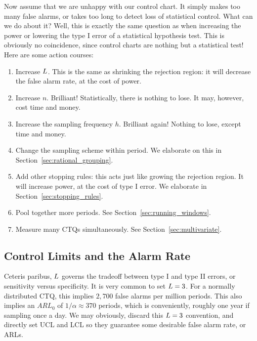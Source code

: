 Now assume that we are unhappy with our control chart. 
It simply makes too many false alarms, or takes too long to detect loss of statistical control.
What can we do about it?
Well, this is exactly the same question as when increasing the power or lowering the type I error of a statistical hypothesis test. This is obviously no coincidence, since control charts are nothing but a statistical test!
Here are some action courses:
\begin{enumerate}
\item Increase $L$. This is the same as shrinking the rejection region: 
it will decrease the false alarm rate, at the cost of power.
\item Increase $n$. Brilliant! Statistically, there is nothing to lose. It may, however, cost time and money.
\item Increase the sampling frequency $h$. Brilliant again! Nothing to lose, except time and money.
\item Change the sampling scheme within period. We elaborate on this in Section~\ref{sec:rational_grouping}.
\item Add other stopping rules: 
this acts just like growing the rejection region. It will increase power, at the cost of type I error. 
We elaborate in Section~\ref{sec:stopping_rules}.
\item Pool together more periods. See Section~\ref{sec:running_windows}.
\item Measure many CTQs simultaneously. See Section~\ref{sec:multivariate}. 
\end{enumerate}






\subsection{Control Limits and the Alarm Rate}
Ceteris paribus, $L$ governs the tradeoff between type I and type II errors, or sensitivity versus specificity.
It is very common to set $L=3$. 
For a normally distributed CTQ, this implies $2,700$ false alarms per million periods. 
This also implies an $ARL_0$ of $1/\alpha \approx 370$ periods, which is conveniently, roughly one year if sampling once a day.
We may obviously, discard this $L=3$ convention, and directly set UCL and LCL so they guarantee some desirable false alarm rate, or ARLs.

